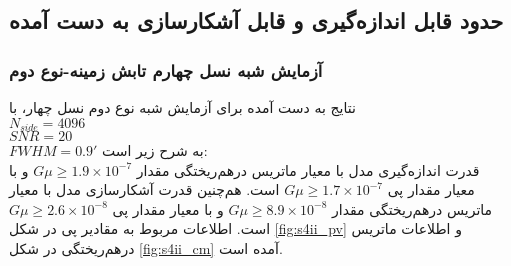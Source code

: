  \subsection{حدود قابل اندازه‌گیری و قابل آشکارسازی به دست آمده}
  \label{subsec:upper_bounds}
  
\subsubsection{آزمایش شبه نسل چهارم تابش زمینه-نوع دوم}
نتایج به دست آمده برای آزمایش شبه نوع دوم نسل چهار، با\\
$N_{side} = 4096$ \\
$SNR=20$\\
$FWHM = 0.9'$
به شرح زیر است:\\
قدرت اندازه‌گیری مدل با معیار ماتریس در‌هم‌ریختگی مقدار 
$G\mu \geq 1.9\times 10^{-7}$
و با معیار مقدار پی 
$G\mu \geq 1.7\times 10^{-7}$
است. هم‌چنین قدرت آشکارسازی مدل با معیار ماتریس در‌هم‌ریختگی مقدار
$G\mu \geq 8.9\times 10^{-8}$
و با معیار مقدار پی 
$G\mu \geq 2.6\times 10^{-8}$
است. اطلاعات مربوط به مقادیر پی در شکل
\ref{fig:s4ii_pv}
و اطلاعات ماتریس درهم‌ریختگی در شکل
\ref{fig:s4ii_cm}
 آمده است.
  	
